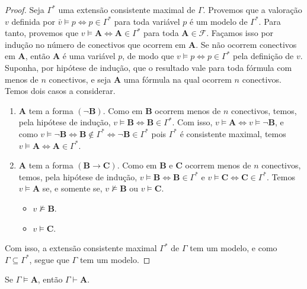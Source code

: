 \begin{proof}
    Seja $\Gamma^*$ uma extensão consistente maximal de $\Gamma$. Provemos que a valoração $v$ definida por $\bar{v} \vDash p \Leftrightarrow p \in \Gamma^*$ para toda variável $p$ é um modelo de $\Gamma^*$. Para tanto, provemos que $v \vDash \mathbf{A} \Leftrightarrow \mathbf{A} \in \Gamma^*$ para toda $\mathbf{A} \in \mathcal{F}$. Façamos isso por indução no número de conectivos que ocorrem em $\mathbf{A}$. Se não ocorrem conectivos em $\mathbf{A}$, então $\mathbf{A}$ é uma variável $p$, de modo que $v \vDash p \Leftrightarrow p \in \Gamma^*$ pela definição de $v$. Suponha, por hipótese de indução, que o resultado vale para toda fórmula com menos de $n$ conectivos, e seja $\mathbf{A}$ uma fórmula na qual ocorrem $n$ conectivos. Temos dois casos a considerar.
        \begin{enumerate}[label=\roman*.]
            \item $\mathbf{A}$ tem a forma $(\neg \mathbf{B})$. Como em $\mathbf{B}$ ocorrem menos de $n$ conectivos, temos, pela hipótese de indução, $v \vDash \mathbf{B} \Leftrightarrow \mathbf{B} \in \Gamma^*$. Com isso, $v \vDash \mathbf{A} \Leftrightarrow v \vDash \neg \mathbf{B}$, e como $v \vDash \neg \mathbf{B} \Leftrightarrow \mathbf{B} \notin \Gamma^* \Leftrightarrow \neg\mathbf{B} \in \Gamma^*$ pois $\Gamma^*$ é consistente maximal, temos $v \vDash \mathbf{A} \Leftrightarrow \mathbf{A} \in \Gamma^*$.
            \item $\mathbf{A}$ tem a forma $(\mathbf{B} \rightarrow \mathbf{C})$. Como em $\mathbf{B}$ e $\mathbf{C}$ ocorrem menos de $n$ conectivos, temos, pela hipótese de indução, $v \vDash \mathbf{B} \Leftrightarrow \mathbf{B} \in \Gamma^*$ e $v \vDash \mathbf{C} \Leftrightarrow \mathbf{C} \in \Gamma^*$. Temos $v \vDash \mathbf{A}$ se, e somente se, $v \not\vDash \mathbf{B}$ ou $v \vDash \mathbf{C}$.
                \begin{itemize}
                    \item $v \not\vDash \mathbf{B}$.
                    \item $v \vDash \mathbf{C}$.
                \end{itemize}
        \end{enumerate}
    Com isso, a extensão consistente maximal $\Gamma^*$ de $\Gamma$ tem um modelo, e como $\Gamma \subseteq \Gamma^*$, segue que $\Gamma$ tem um modelo. \blackproof
\end{proof}

\begin{theorem} \label{teo.fund:completudeproposicionalforte}
    Se $\Gamma \vDash \mathbf{A}$, então $\Gamma \vdash \mathbf{A}$.
\end{theorem}

